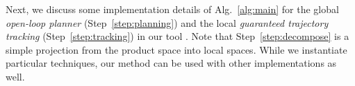 Next, we discuss some implementation details of Alg.~\ref{alg:main} for the global \emph{open-loop planner} (Step~\ref{step:planning}) and the local \emph{guaranteed trajectory tracking} (Step~\ref{step:tracking}) in our tool \tool. Note that Step~\ref{step:decompose} is a simple projection from the product space into local spaces.
While we instantiate particular techniques, our method can be used with other implementations as well.
%
